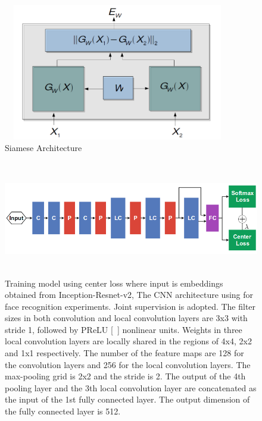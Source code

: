 \documentclass[a4paper,12pt, twoside]{NITKReport}
\begin{document}
\begin{figure} [h]
\centering
    \includegraphics[height=6cm,width=10cm]{siamese.png}
    \caption{Siamese Architecture}
    \label{siamese}
\end{figure}
\begin{figure} [h]
\centering
    \includegraphics[height=5cm,width=15cm]{center.png}
    \caption{Training model using center loss where input is embeddings obtained from Inception-Resnet-v2, The CNN architecture using for face recognition experiments. Joint supervision is adopted. The filter sizes in both convolution and local convolution layers are 3x3 with stride 1, followed by PReLU [~\cite{DBLP:journals/corr/HeZR015}] nonlinear units. Weights in three local convolution layers are locally shared in the regions of 4x4, 2x2 and 1x1 respectively. The number of the feature maps are 128 for the convolution layers and 256 for the local convolution layers. The max-pooling grid is 2x2 and the stride is 2. The output of the 4th pooling layer and the 3th local convolution layer are concatenated as the input of the 1st fully connected layer. The output dimension of the fully connected layer is 512.}
    \label{center}
\end{figure}
\end{document}
